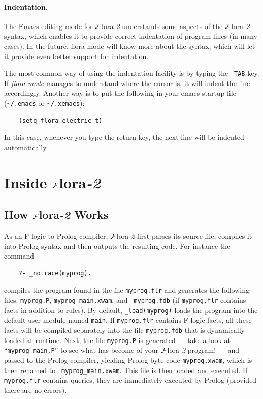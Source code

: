 \documentclass[11pt]{article}
\newcommand{\FLORA}{{\mbox{\sc ${\cal F}${lora}\rm\emph{-2}}}\xspace}
\newcommand{\fl}{\mbox{F-logic}\xspace}
\newcommand{\ofile}{xwam}
\begin{document}
\paragraph{Indentation.}
The Emacs editing mode for \FLORA
understands some aspects of the \FLORA syntax, which
enables it to provide correct indentation of program lines (in many cases).
In the future, flora-mode will know more about the syntax, which will let
it provide even better support for indentation.

The most common way of using the indentation facility is by typing the {\tt
  TAB}-key. If \emph{flora-mode} manages to understand where the cursor is,
it will indent the line accordingly. Another way is to put the following in
your emacs startup file (\verb|~/.emacs| or \verb|~/.xemacs|):
\begin{verbatim}
    (setq flora-electric t)  
\end{verbatim}
In this case, whenever you type the return key, the next line will be
indented automatically.




\newpage
\section{Inside \FLORA}

\subsection{How \FLORA Works}


As an \fl-to-Prolog compiler, \FLORA first parses its source file,
compiles it into Prolog syntax and then outputs the resulting code. For
instance the command 
\begin{verbatim}
    ?- _notrace(myprog).
\end{verbatim}
compiles the program found in the file {\tt myprog.flr} and generates the
following files: {\tt myprog.P}, {\tt myprog\_main.\ofile}, and {\tt
  myprog.fdb} (if {\tt myprog.flr} contains facts in addition to rules).
By default, {\tt \_load(myprog)} loads the program into the default user
module named {\tt main}. If {\tt myprog.flr} contains \fl facts, all these
facts will be compiled separately into the file {\tt myprog.fdb} that is
dynamically loaded at runtime.  Next, the file {\tt myprog.P} is generated
--- take a look at ``{\tt myprog\_main.P}'' to see what has become of your
\FLORA program! --- and passed to the Prolog compiler, yielding Prolog byte
code {\tt myprog.\ofile}, which is then renamed to {\tt
  myprog\_main.\ofile}. This file is then loaded and executed.  If {\tt
  myprog.flr} contains queries, they are immediately executed by Prolog
(provided there are no errors).
\end{document}
